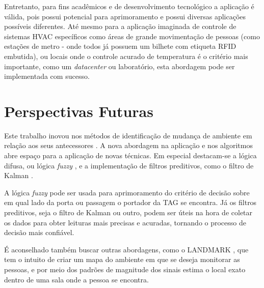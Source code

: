 Entretanto, para fins acadêmicos e de desenvolvimento tecnológico a aplicação é válida, pois possui potencial para aprimoramento e possui diversas aplicações possíveis diferentes. Até mesmo para a aplicação imaginada de controle de sistemas HVAC específicos como áreas de grande movimentação de pessoas (como estações de metro - onde todos já possuem um bilhete com etiqueta RFID embutida), ou locais onde o controle acurado de temperatura é o critério mais importante, como um \textit{datacenter} ou laboratório, esta abordagem pode ser implementada com sucesso.


\section{Perspectivas Futuras}

Este trabalho inovou nos métodos de identificação de mudança de ambiente em relação aos seus antecessores \cite{TG2013OliveiraERocha} \cite{TG2015RaissaERenata}. A nova abordagem na aplicação e nos algoritmos abre espaço para a aplicação de novas técnicas. Em especial destacam-se a lógica difusa, ou lógica \textit{fuzzy} \cite{yen1999fuzzy}, e a implementação de filtros preditivos, como o filtro de Kalman \cite{welch1995introduction}.

A lógica \textit{fuzzy} pode ser usada para aprimoramento do critério de decisão sobre em qual lado da porta ou passagem o portador da TAG se encontra. Já os filtros preditivos, seja o filtro de Kalman ou outro, podem ser úteis na hora de coletar os dados para obter leituras mais precisas e acuradas, tornando o processo de decisão mais confiável.

É aconselhado também buscar outras abordagens, como o LANDMARK \cite{bekkali2007rfid}, que tem o intuito de criar um mapa do ambiente em que se deseja monitorar as pessoas, e por meio dos padrões de magnitude dos sinais estima o local exato dentro de uma sala onde a pessoa se encontra.
